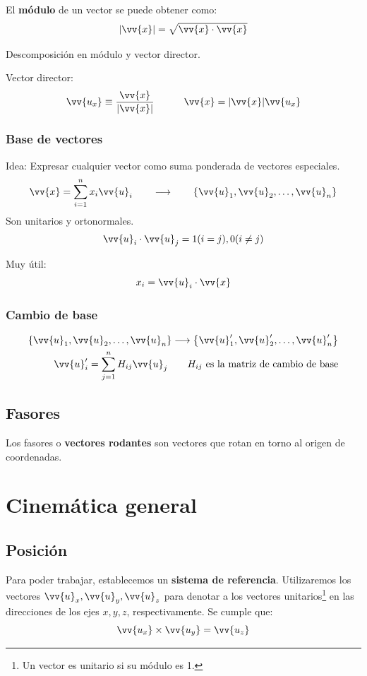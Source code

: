 \documentclass[a4paper]{book}
\numberwithin{figure}{chapter}
\numberwithin{equation}{chapter}
\renewcommand{\vec}[1]{\vv{{#1}}}
\begin{document}
El \textbf{módulo} de un vector se puede obtener como: \[\abs{\vec{x}}=\sqrt{\vec{x}\cdot \vec{x}}\]

Descomposición en módulo y vector director.

Vector director: \[\vec{u_x}\equiv \frac{\vec{x}}{\abs{\vec{x}}} \qquad \quad \vec{x} = \abs{\vec{x}}\vec{u_x}\]

\subsubsection{Base de vectores}
Idea: Expresar cualquier vector como suma ponderada de vectores especiales. \[\vec{x} = \sum^{n}_{i=1}{x_i\vec{u}_i}\qquad \longrightarrow \qquad \left\lbrace \vec{u}_1,\vec{u}_2,\ldots ,\vec{u}_n \right\rbrace\]
Son unitarios y ortonormales. \[\vec{u}_i\cdot \vec{u}_j =1 (i=j), 0(i\not =j)\]

Muy útil: \[x_i = \vec{u}_i \cdot \vec{x}\]

\subsubsection{Cambio de base}
\[\begin{split}
		\left\lbrace \vec{u}_1,\vec{u}_2,\ldots ,\vec{u}_n \right\rbrace \longrightarrow \left\lbrace \vec{u}_1',\vec{u}_2',\ldots ,\vec{u}_n' \right\rbrace \\  \vec{u}_i' = \sum^{n}_{j=1}{H_{ij}\vec{u}_j} \qquad H_{ij} \text{ es la matriz de cambio de base}
	\end{split}\]

\subsection{Fasores} \label{subsec:fasores}
Los fasores o \textbf{vectores rodantes} son vectores que rotan en torno al origen de coordenadas.
\section{Cinemática general}


\subsection{Posición}
Para poder trabajar, establecemos un \textbf{sistema de referencia}. Utilizaremos los vectores $\vec{u}_x, \vec{u}_y, \vec{u}_z$ para denotar a los vectores unitarios\footnote{Un vector es unitario si su módulo es 1.} en las direcciones de los ejes $x, y, z$, respectivamente. Se cumple que: \[\vec{u_x} \times \vec{u_y} = \vec{u_z} \]
\end{document}

